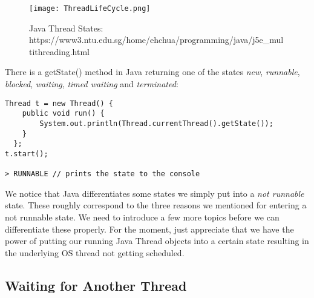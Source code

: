 \documentclass[main.tex]{subfiles}
\begin{document}
\begin{figure}[H]
    \centering
    \texttt{[image: ThreadLifeCycle.png]}
    \caption{Java Thread States: https://www3.ntu.edu.sg/home/ehchua/programming/java/j5e\_multithreading.html}
\end{figure}
There is a getState() method in Java returning one of the states \textit{new}, \textit{runnable}, \textit{blocked}, \textit{waiting}, \textit{timed waiting} and \textit{terminated}:
\begin{verbatim}
Thread t = new Thread() {
    public void run() {
        System.out.println(Thread.currentThread().getState());
    }
  };
t.start();

> RUNNABLE // prints the state to the console
\end{verbatim}
We notice that Java differentiates some states we simply put into a \textit{not runnable} state. These roughly correspond to the three reasons we mentioned for entering a not runnable state. We need to introduce a few more topics before we can differentiate these properly. For the moment, just appreciate that we have the power of putting our running Java Thread objects into a certain state resulting in the underlying OS thread not getting scheduled.

\subsection{Waiting for Another Thread}
\end{document}
